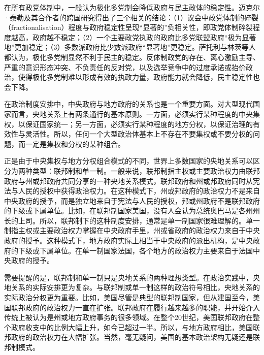 在所有政党体制中，一般认为极化多党制会降低政府与民主政体的稳定性。迈克尔·泰勒及其合作者的跨国研究得出了三个相关的结论：（1）议会中政党体制的碎裂（fractionalisation）程度与政府稳定性呈现“显著的”负相关性，即政党体制碎裂程度越高，政府越不稳定；（2）一个主要政党执政的政府比多党联盟政府“极为显著地”更加稳定；（3）多数派政府比少数派政府“显著地”更稳定。萨托利与林茨等人都认为，极化多党制显然不利于民主的稳定。反体制政党的存在、离心激励主导、严重的意识形态冲突、不负责任的反对党，以及选举竞争中的过度承诺或抬价政治，使得极化多党制难以形成有效的执政力量，政府能力就会降低，民主稳定性也会下降。


在政治制度安排中，中央政府与地方政府的关系也是一个重要方面。对大型现代国家而言，央地关系上有两条通行的基本原则。一方面，必须实行某种程度的中央集权，以保证国家统一；另一方面，必须实行某种程度的地方分权，以保证治理的有效性与灵活性。所以，任何一个大型政治体基本上不存在不要集权或不要分权的问题，而一定是集权和分权的某种组合。

正是由于中央集权与地方分权组合模式的不同，世界上多数国家的央地关系可以区分为两种类型：联邦制和单一制。一般来说，联邦制指主权或主要政治权力由联邦政府与州或邦政府共同分享的一种央地关系模式，联邦政府和州或邦政府同时从宪法与人民的授权中获得政治权力。在这种模式下，州或邦政府的政治权力不是来自中央政府的授予，而是独立地来自于宪法与人民的授权，邦或州政府不是联邦政府的下级或下属单位。比如，在联邦制国家美国，没有人会认为总统奥巴马是各州州长的上司。所以，联邦制下的这种制度安排，通常是单一制国家很难理解的。单一制指主权或主要政治权力掌握在中央政府手里，州或省政府的政治权力来自于中央政府的授予。这种模式下，地方政府实际上相当于中央政府的派出机构，是中央政府的下级或下属单位。在单一制国家法国，各个地方的政治权力主要来自于法国中央政府的授予。

需要提醒的是，联邦制和单一制只是央地关系的两种理想类型。在政治实践中，央地关系的实际安排更为复杂。与联邦制或单一制这样的政治符号相比，央地关系的实际政治分权更为重要。比如，美国尽管是典型的联邦制国家，但从建国至今，美国联邦政府的政治权力一直在扩张。联邦政府在履行越来越多的职能，并开始介入传统上被认为是州或地方政府事务的很多领域。在整个20世纪，美国联邦政府在整个政府收支中的比例大幅上升，如今已超过一半。所以，与地方政府相比，美国联邦政府的政治权力在大幅扩张。当然，毫无疑问，美国的基本政治架构无疑还是联邦制模式。

